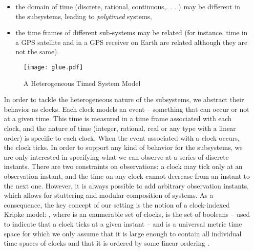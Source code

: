 \begin{isabellebody}
\begin{isamarkuptext}
\begin{itemize}
\item the domain of time (discrete, rational, continuous,. . . ) may be different in the subsystems, 
leading to \emph{polytimed} systems,

\item the time frames of different sub-systems may be related (for instance, time in a GPS satellite 
and in a GPS receiver on Earth are related although they are not the same).%
\end{itemize}%
\end{isamarkuptext}\isamarkuptrue%
%
\begin{isamarkuptext}%
\begin{figure}[htbp]
 \centering
 \texttt{[image: glue.pdf]}
 \caption{A Heterogeneous Timed System Model}
 \label{fig:het-timed-system}
\end{figure}%
\end{isamarkuptext}\isamarkuptrue%
%
\begin{isamarkuptext}%
In order to tackle the heterogeneous nature of the subsystems, we abstract their behavior as clocks. 
Each clock models an event – something that can occur or not at a given time. This time is measured 
in a time frame associated with each clock, and the nature of time (integer, rational, real or any 
type with a linear order) is specific to each clock. 
When the event associated with a clock occurs, the clock ticks. In order to support any kind of 
behavior for the subsystems, we are only interested in specifying what we can observe at a series 
of discrete instants. There are two constraints on observations: a clock may tick only at an 
observation instant, and the time on any clock cannot decrease from an instant to the next one. 
However, it is always possible to add arbitrary observation instants, which allows for stuttering 
and modular composition of systems. 
As a consequence, the key concept of our setting is the notion of a clock-indexed Kripke model: 
\isa{{\isasymSigma}\isactrlsup {\isasyminfinity}\ {\isacharequal}\ {\isasymnat}\ {\isasymrightarrow}\ {\isasymK}\ {\isasymrightarrow}\ {\isacharparenleft}{\isasymbool}\ {\isasymtimes}\ {\isasymT}{\isacharparenright}}, where \isa{{\isasymK}} is an enumerable set of clocks, \isa{{\isasymbool}} 
is the set of booleans – used to  indicate that a clock ticks at a given instant – and \isa{{\isasymT}} 
is a universal metric time space for which we only assume that it is large enough to contain all 
individual time spaces of clocks and that it is ordered by some linear ordering \isa{{\isacharparenleft}{\isasymle}\isactrlsub {\isasymT}{\isacharparenright}}.%

\end{isamarkuptext}
\end{isabellebody}
